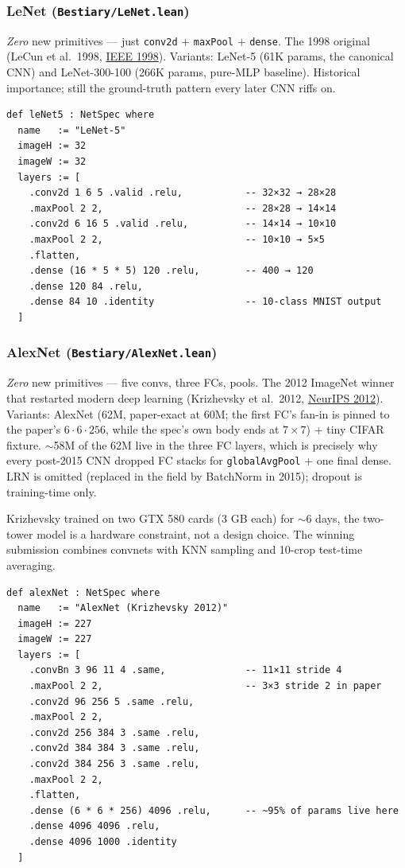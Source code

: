 \subsubsection*{LeNet (\texttt{Bestiary/LeNet.lean})}
\emph{Zero} new primitives --- just \texttt{conv2d} $+$ \texttt{maxPool}
$+$ \texttt{dense}. The 1998 original (LeCun et al.\ 1998,
\href{http://yann.lecun.com/exdb/publis/pdf/lecun-98.pdf}{IEEE 1998}).
Variants: LeNet-5 (61K params,
the canonical CNN) and LeNet-300-100 (266K params, pure-MLP baseline).
Historical importance; still the ground-truth pattern every later CNN
riffs on.

\begin{verbatim}
def leNet5 : NetSpec where
  name   := "LeNet-5"
  imageH := 32
  imageW := 32
  layers := [
    .conv2d 1 6 5 .valid .relu,           -- 32×32 → 28×28
    .maxPool 2 2,                         -- 28×28 → 14×14
    .conv2d 6 16 5 .valid .relu,          -- 14×14 → 10×10
    .maxPool 2 2,                         -- 10×10 → 5×5
    .flatten,
    .dense (16 * 5 * 5) 120 .relu,        -- 400 → 120
    .dense 120 84 .relu,
    .dense 84 10 .identity                -- 10-class MNIST output
  ]
\end{verbatim}

\subsubsection*{AlexNet (\texttt{Bestiary/AlexNet.lean})}
\emph{Zero} new primitives --- five convs, three FCs, pools. The 2012
ImageNet winner that restarted modern deep learning (Krizhevsky et al.\ 2012,
\href{https://papers.nips.cc/paper_files/paper/2012/hash/c399862d3b9d6b76c8436e924a68c45b-Abstract.html}{NeurIPS 2012}). Variants:
AlexNet (62M, paper-exact at 60M; the first FC's fan-in is pinned to the
paper's $6 \cdot 6 \cdot 256$, while the spec's own body ends at $7 \times 7$) + tiny CIFAR fixture. $\sim$58M of
the 62M live in the three FC layers, which is precisely why every
post-2015 CNN dropped FC stacks for \texttt{globalAvgPool} + one final
dense. LRN is omitted (replaced in the field by BatchNorm in 2015);
dropout is training-time only.

Krizhevsky trained on two GTX 580 cards (3 GB each) for $\sim$6 days,
the two-tower model is a hardware constraint, not a design choice.
The winning submission combines convnets with KNN sampling and
10-crop test-time averaging.

\begin{verbatim}
def alexNet : NetSpec where
  name   := "AlexNet (Krizhevsky 2012)"
  imageH := 227
  imageW := 227
  layers := [
    .convBn 3 96 11 4 .same,              -- 11×11 stride 4
    .maxPool 2 2,                         -- 3×3 stride 2 in paper
    .conv2d 96 256 5 .same .relu,
    .maxPool 2 2,
    .conv2d 256 384 3 .same .relu,
    .conv2d 384 384 3 .same .relu,
    .conv2d 384 256 3 .same .relu,
    .maxPool 2 2,
    .flatten,
    .dense (6 * 6 * 256) 4096 .relu,      -- ~95% of params live here
    .dense 4096 4096 .relu,
    .dense 4096 1000 .identity
  ]
\end{verbatim}

